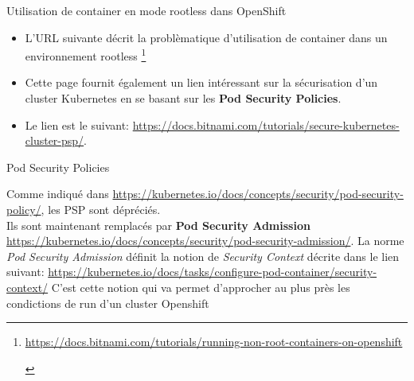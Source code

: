 \begin{frame}[fragile]{Utilisation de container en mode rootless dans OpenShift}

   \begin{itemize}
      \item L'URL suivante décrit la problèmatique d'utilisation de container dans un environnement rootless \footnote{
\begin{tcolorbox}
   \url{https://docs.bitnami.com/tutorials/running-non-root-containers-on-openshift} \\
\end{tcolorbox}
}
\item Cette page fournit également un lien intéressant sur la sécurisation d'un cluster Kubernetes en se basant sur les \textbf{Pod Security Policies}.\\
\item Le lien est le suivant:
   \url{https://docs.bitnami.com/tutorials/secure-kubernetes-cluster-psp/}.
   \end{itemize}

\end{frame}


\begin{frame}[fragile]{Pod Security Policies}

   Comme indiqué dans \url{https://kubernetes.io/docs/concepts/security/pod-security-policy/}, les PSP sont dépréciés.\\
   Ils sont maintenant remplacés par \textbf{Pod Security Admission} \url{https://kubernetes.io/docs/concepts/security/pod-security-admission/}.
   La norme \textit{Pod Security Admission} définit la notion de \textit{Security Context} décrite dans le lien suivant:
   \url{https://kubernetes.io/docs/tasks/configure-pod-container/security-context/}
   C'est cette notion qui va permet d'approcher au plus près les condictions de run d'un cluster Openshift 

\end{frame}


